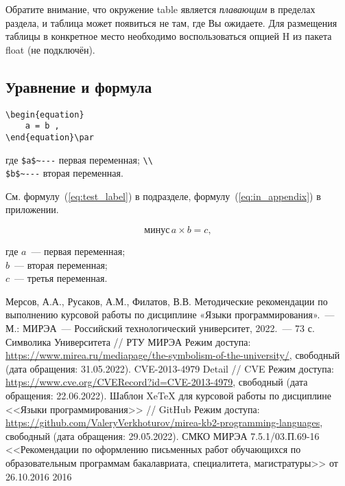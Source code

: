 \documentclass[14pt, a4paper, titlepage]{extarticle}
\begin{document}
Обратите внимание, что окружение table является \emph{плавающим} в пределах раздела, и таблица может появиться не там, где Вы ожидаете. Для размещения таблицы в конкретное место необходимо воспользоваться опцией H из пакета float (не подключён).

\subsection{Уравнение и формула}

\begin{verbatim}
\begin{equation}
    a = b ,
\end{equation}\par
\end{verbatim}\vspace{-.5cm}
{где \verb"$a$~---" первая переменная; \verb"\\" \\
\verb"$b$~---" вторая переменная.}\bigskip

См. формулу~(\ref{eq:test_label}) в подразделе, формулу~(\ref{eq:in_appendix}) в приложении.

\begin{equation}\label{eq:test_label}
    \text{минус}\,a\times b=c ,
\end{equation}

где $a$~--- первая переменная; \\
$b$~--- вторая переменная; \\
$c$~--- третья переменная.



\begin{thebibliography}{99\kern\bibindent}
     Мерсов, А.А., Русаков, А.М., Филатов, В.В. Методические рекомендации по выполнению курсовой работы по дисциплине «Языки программирования».~--- М.: МИРЭА~--- Российский технологический университет, 2022.~--- 73 с.
     Символика Университета // РТУ МИРЭА Режим доступа: \url{https://www.mirea.ru/mediapage/the-symbolism-of-the-university/}, свободный (дата обращения: 31.05.2022).
     CVE-2013-4979 Detail // CVE Режим доступа: \url{https://www.cve.org/CVERecord?id=CVE-2013-4979}, свободный (дата обращения: 22.06.2022).
     Шаблон XeTeX для курсовой работы по дисциплине <<Языки программирования>> // GitHub Режим доступа: \url{https://github.com/ValeryVerkhoturov/mirea-kb2-programming-languages}, свободный (дата обращения: 29.05.2022).
     СМКО МИРЭА 7.5.1/03.П.69-16 <<Рекомендации по оформлению письменных работ обучающихся по образовательным программам бакалавриата, специалитета, магистратуры>> от 26.10.2016 2016
\end{thebibliography}
\end{document}
